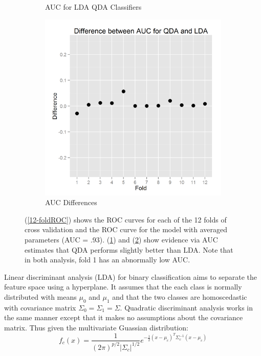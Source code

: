 \documentclass{article}\usepackage[]{graphicx}\usepackage[]{color}
\begin{document}
\begin{figure}[h]
\begin{subfigure}[b]{0.3\textwidth}
    \caption{AUC for LDA QDA Classifiers}
    \label{12-foldAUC}
  \end{subfigure}  
  \begin{subfigure}[b]{0.3\textwidth}
    \includegraphics[width=\linewidth]{AUC_difference.png}
    \caption{AUC Differences}
    \label{12-foldAUCdiff}
  \end{subfigure}    
  \caption{(\ref{12-foldROC}) shows the ROC curves for each of the 12 folds of cross validation and the ROC curve for the model with averaged parameters (AUC = .93).  (\ref{12-foldAUC}) and (\ref{12-foldAUCdiff}) show evidence via AUC estimates that QDA performs slightly better than LDA.  Note that in both analysis, fold 1 has an abnormally low AUC.}
  \label{fig:qda_lda}
\end{figure}
Linear discriminant analysis (LDA) for binary classification aims to separate the feature space using a hyperplane.  It assumes that the each class is normally distributed with means $\mu_0$ and $\mu_1$ and that the two classes are homoscedastic with covariance matrix $\Sigma_0=\Sigma_1=\Sigma$.  Quadratic discriminant analysis works in the same manner except that it makes no assumptions about the covariance matrix.  Thus given the multivariate Guassian distribution:
\begin{equation}
f_c(x) = \frac{1}{(2 \pi)^{p/2} \vert \Sigma_c \vert ^{1/2}} e^{-\frac{1}{2}(x-\mu_c)^T \Sigma_c^{-1} (x-\mu_c)}
\end{equation}
\end{document}
